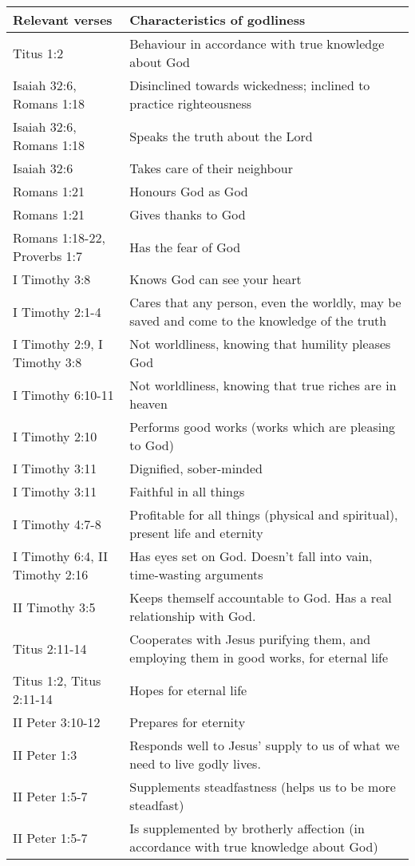 \documentclass[11pt]{article}
\begin{document}
\begin{center}
\begin{tabular}{ll}
Relevant verses & Characteristics of godliness\\[0pt]
\hline
Titus 1:2 & Behaviour in accordance with true knowledge about God\\[0pt]
Isaiah 32:6, Romans 1:18 & Disinclined towards wickedness; inclined to practice righteousness\\[0pt]
Isaiah 32:6, Romans 1:18 & Speaks the truth about the Lord\\[0pt]
Isaiah 32:6 & Takes care of their neighbour\\[0pt]
Romans 1:21 & Honours God as God\\[0pt]
Romans 1:21 & Gives thanks to God\\[0pt]
Romans 1:18-22, Proverbs 1:7 & Has the fear of God\\[0pt]
I Timothy 3:8 & Knows God can see your heart\\[0pt]
I Timothy 2:1-4 & Cares that any person, even the worldly, may be saved and come to the knowledge of the truth\\[0pt]
I Timothy 2:9, I Timothy 3:8 & Not worldliness, knowing that humility pleases God\\[0pt]
I Timothy 6:10-11 & Not worldliness, knowing that true riches are in heaven\\[0pt]
I Timothy 2:10 & Performs good works (works which are pleasing to God)\\[0pt]
I Timothy 3:11 & Dignified, sober-minded\\[0pt]
I Timothy 3:11 & Faithful in all things\\[0pt]
I Timothy 4:7-8 & Profitable for all things (physical and spiritual), present life and eternity\\[0pt]
I Timothy 6:4, II Timothy 2:16 & Has eyes set on God. Doesn't fall into vain, time-wasting arguments\\[0pt]
II Timothy 3:5 & Keeps themself accountable to God. Has a real relationship with God.\\[0pt]
Titus 2:11-14 & Cooperates with Jesus purifying them, and employing them in good works, for eternal life\\[0pt]
Titus 1:2, Titus 2:11-14 & Hopes for eternal life\\[0pt]
II Peter 3:10-12 & Prepares for eternity\\[0pt]
II Peter 1:3 & Responds well to Jesus' supply to us of what we need to live godly lives.\\[0pt]
II Peter 1:5-7 & Supplements steadfastness (helps us to be more steadfast)\\[0pt]
II Peter 1:5-7 & Is supplemented by brotherly affection (in accordance with true knowledge about God)\\[0pt]
\end{tabular}
\end{center}
\end{document}
